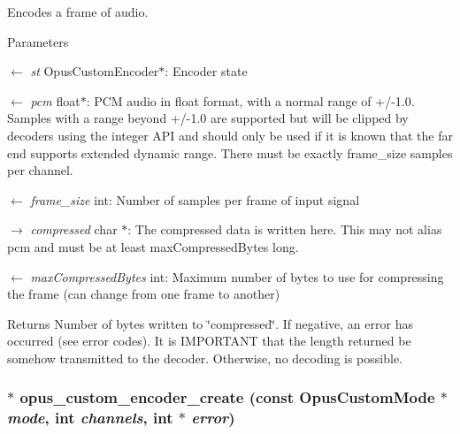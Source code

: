 Encodes a frame of audio. 
\begin{DoxyParams}{Parameters}
\item[\mbox{$\leftarrow$} {\em st}]{\ttfamily OpusCustomEncoder$\ast$}: Encoder state \item[\mbox{$\leftarrow$} {\em pcm}]{\ttfamily float$\ast$}: PCM audio in float format, with a normal range of +/-\/1.0. Samples with a range beyond +/-\/1.0 are supported but will be clipped by decoders using the integer API and should only be used if it is known that the far end supports extended dynamic range. There must be exactly frame\_\-size samples per channel. \item[\mbox{$\leftarrow$} {\em frame\_\-size}]{\ttfamily int}: Number of samples per frame of input signal \item[\mbox{$\rightarrow$} {\em compressed}]{\ttfamily char $\ast$}: The compressed data is written here. This may not alias pcm and must be at least maxCompressedBytes long. \item[\mbox{$\leftarrow$} {\em maxCompressedBytes}]{\ttfamily int}: Maximum number of bytes to use for compressing the frame (can change from one frame to another) \end{DoxyParams}
\begin{DoxyReturn}{Returns}
Number of bytes written to \char`\"{}compressed\char`\"{}. If negative, an error has occurred (see error codes). It is IMPORTANT that the length returned be somehow transmitted to the decoder. Otherwise, no decoding is possible. 
\end{DoxyReturn}
\hypertarget{group__opus__custom_ga5aa778f7b0d93b397c1c0fb04b59eb02}{
\subsubsection[{opus\_\-custom\_\-encoder\_\-create}]{$\ast$ opus\_\-custom\_\-encoder\_\-create (const {\bf OpusCustomMode} $\ast$ {\em mode}, \/  int {\em channels}, \/  int $\ast$ {\em error})}}
\label{group__opus__custom_ga5aa778f7b0d93b397c1c0fb04b59eb02}


